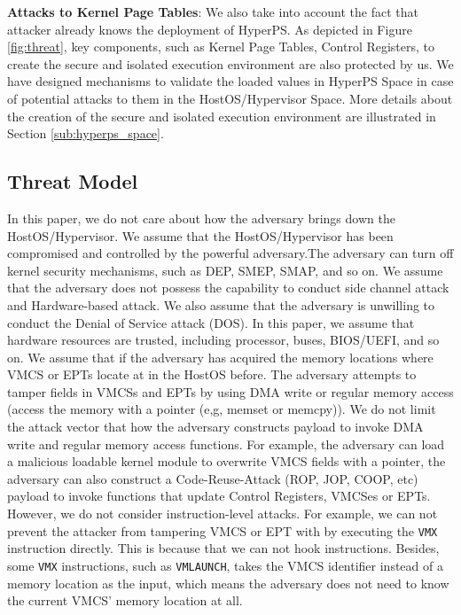 \textbf{Attacks to Kernel Page Tables}: 
We also take into account the fact that attacker already knows the deployment of HyperPS. As depicted in Figure \ref{fig:threat}, key components, such as Kernel Page Tables, Control Registers, to create the secure and isolated execution environment are also protected by us. We have designed mechanisms to validate the loaded values in HyperPS Space in case of potential attacks to them in the HostOS/Hypervisor Space.  
More details about the creation of the secure and isolated execution environment are illustrated in Section \ref{sub:hyperps_space}. 
 


\subsection{Threat Model} \label{sub:threatmodel}
In this paper,  we do not care about how the adversary brings down the HostOS/Hypervisor. 
We assume that the HostOS/Hypervisor has been compromised and controlled by the powerful adversary.The adversary can turn off kernel security mechanisms, such as DEP, SMEP, SMAP, and so on.
We assume that the adversary does not possess the capability to conduct side channel attack and Hardware-based attack. We also assume that the adversary is unwilling to conduct the Denial of Service attack (DOS). In this paper, we assume that hardware resources are trusted, including processor, buses, BIOS/UEFI, and so on. 
We assume that if the adversary has acquired the memory locations where VMCS or EPTs locate at in the HostOS before. The adversary attempts to tamper fields in VMCSs and EPTs by using DMA write or regular memory access (access the memory with a pointer (e,g, memset or memcpy)). 
We do not limit the attack vector that how the adversary constructs payload to invoke DMA write and regular memory access functions. For example, the adversary can load a malicious loadable kernel module to overwrite VMCS fields with a pointer, the adversary can also construct a Code-Reuse-Attack (ROP, JOP, COOP, etc) payload to invoke functions that update Control Registers, VMCSes or EPTs. 
However, we do not consider instruction-level attacks. For example, we can not prevent the attacker from tampering VMCS or EPT with by executing the \verb|VMX| instruction directly. This is because that we can not hook instructions. Besides, some \verb|VMX| instructions, such as \verb|VMLAUNCH|, takes the VMCS identifier instead of a memory location as the input, which means the adversary does not need to know the current VMCS' memory location at all. 

